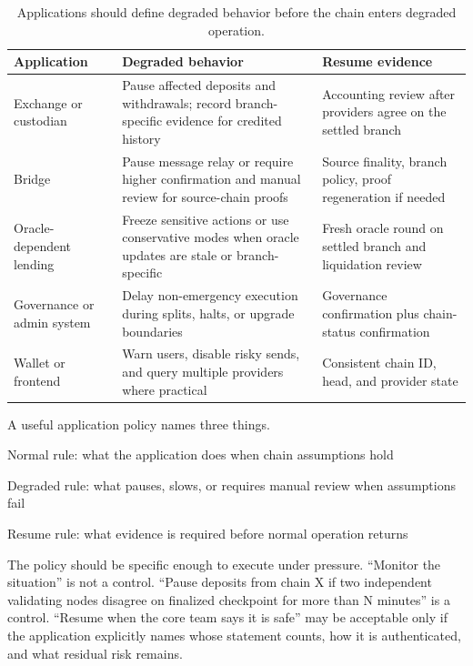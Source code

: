\begin{table}[htbp]
\centering
\small
\renewcommand{\arraystretch}{1.15}
\begin{tabularx}{\textwidth}{@{}>{\RaggedRight\arraybackslash}p{}>{\RaggedRight\arraybackslash}p{}X@{}}
\toprule
Application & Degraded behavior & Resume evidence \\
\midrule
Exchange or custodian & Pause affected deposits and withdrawals; record branch-specific evidence for credited history & Accounting review after providers agree on the settled branch \\
Bridge & Pause message relay or require higher confirmation and manual review for source-chain proofs & Source finality, branch policy, proof regeneration if needed \\
Oracle-dependent lending & Freeze sensitive actions or use conservative modes when oracle updates are stale or branch-specific & Fresh oracle round on settled branch and liquidation review \\
Governance or admin system & Delay non-emergency execution during splits, halts, or upgrade boundaries & Governance confirmation plus chain-status confirmation \\
Wallet or frontend & Warn users, disable risky sends, and query multiple providers where practical & Consistent chain ID, head, and provider state \\
\bottomrule
\end{tabularx}
\caption{Applications should define degraded behavior before the chain enters degraded operation.}
\end{table}

A useful application policy names three things.

\begin{codeblock}
Normal rule:
    what the application does when chain assumptions hold

Degraded rule:
    what pauses, slows, or requires manual review when assumptions fail

Resume rule:
    what evidence is required before normal operation returns
\end{codeblock}

The policy should be specific enough to execute under pressure. ``Monitor the situation'' is not a control. ``Pause deposits from chain X if two independent validating nodes disagree on finalized checkpoint for more than N minutes'' is a control. ``Resume when the core team says it is safe'' may be acceptable only if the application explicitly names whose statement counts, how it is authenticated, and what residual risk remains.

